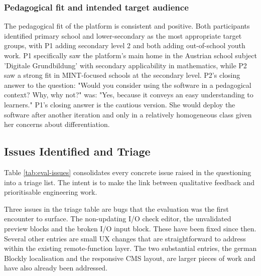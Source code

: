 \subsubsection*{Pedagogical fit and intended target audience}
The pedagogical fit of the platform is consistent and positive.
Both participants identified primary school and lower-secondary as the most
appropriate target groups, with P1 adding secondary level 2 and both adding
out-of-school youth work. P1 specifically saw the platform's main home in the Austrian school
subject 'Digitale Grundbildung' with secondary applicability in mathematics, while P2 saw a strong
fit in MINT-focused schools at the secondary level.
P2's closing answer to the question: "Would you consider using the software in a pedagogical context? Why, why not?" was: "Yes, because
it conveys an easy understanding to learners."
P1's closing answer is the cautious version. She would deploy the software after another iteration and
only in a relatively homogeneous class given her concerns about differentiation.

\subsection{Issues Identified and Triage}
Table \ref{tab:eval-issues} consolidates every concrete issue raised in the questioning into a triage list.
The intent is to make the link between qualitative feedback and prioritisable engineering work.

Three issues in the triage table are bugs that the evaluation was the first encounter to surface.
The non-updating I/O check editor, the unvalidated preview blocks and the broken I/O input block.
These have been fixed since then.
Several other entries are small UX changes that are straightforward to address within the existing remote-function layer.
The two substantial entries, the german Blockly localisation and the responsive CMS layout, are larger pieces of work and have
also already been addressed.

